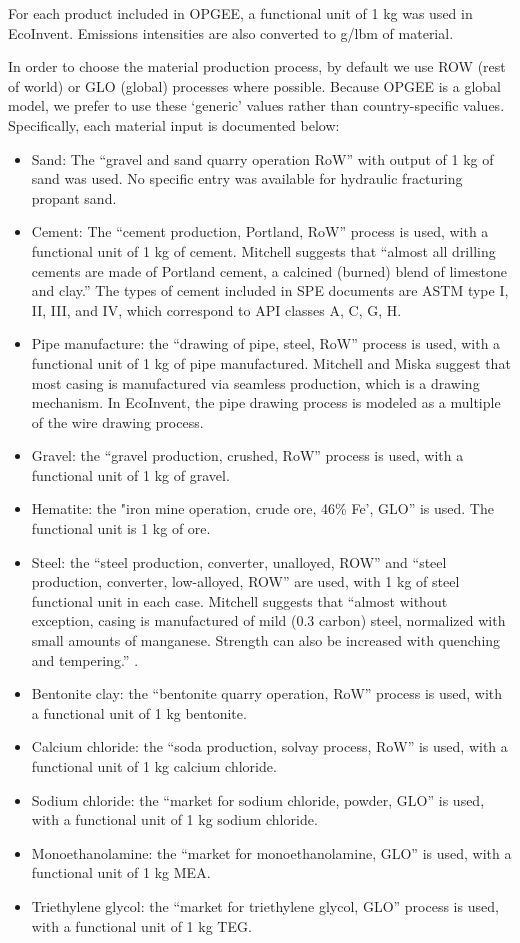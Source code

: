 \documentclass[11pt]{report}
\begin{document}
For each product included in OPGEE, a functional unit of 1 kg was used in EcoInvent. Emissions intensities are also converted to g/lbm of material.

In order to choose the material production process, by default we use ROW (rest of world) or GLO (global) processes where possible. Because OPGEE is a global model, we prefer to use these `generic' values rather than country-specific values. Specifically, each material input is documented below:
\begin{itemize}
\item Sand: The ``gravel and sand quarry operation RoW'' with output of 1 kg of sand was used. No specific entry was available for hydraulic fracturing propant sand.
\item Cement: The ``cement production, Portland, RoW'' process is used, with a functional unit of 1 kg of cement. Mitchell suggests \cite[p. 382]{Mitchell2006} that ``almost all drilling cements are made of Portland cement, a calcined (burned) blend of limestone and clay.'' The types of cement included in SPE documents are ASTM type I, II, III, and IV, which correspond to API classes A, C, G, H.
\item Pipe manufacture: the ``drawing of pipe, steel, RoW'' process is used, with a functional unit of 1 kg of pipe manufactured. Mitchell and Miska \cite[p. 387]{Mitchell2011} suggest that most casing is manufactured via seamless production, which is a drawing mechanism. In EcoInvent, the pipe drawing process is modeled as a multiple of the wire drawing process.
\item Gravel: the ``gravel production, crushed, RoW'' process is used, with a functional unit of 1 kg of gravel.
\item Hematite: the "iron mine operation, crude ore, 46\% Fe', GLO'' is used. The functional unit is 1 kg of ore.
\item Steel: the ``steel production, converter, unalloyed, ROW'' and ``steel production, converter, low-alloyed, ROW'' are used, with 1 kg of steel functional unit in each case. Mitchell suggests that ``almost without exception, casing is manufactured of mild (0.3 carbon) steel, normalized with small amounts of manganese. Strength can also be increased with quenching and tempering.'' \cite[p. 288]{Mitchell2006}.
\item Bentonite clay: the ``bentonite quarry operation, RoW'' process is used, with a functional unit of 1 kg bentonite.
\item Calcium chloride: the ``soda production, solvay process, RoW'' is used, with a functional unit of 1 kg calcium chloride.
\item Sodium chloride: the ``market for sodium chloride, powder, GLO'' is used, with a functional unit of 1 kg sodium chloride.
\item Monoethanolamine: the ``market for monoethanolamine, GLO'' is used, with a functional unit of 1 kg MEA.
\item Triethylene glycol: the ``market for triethylene glycol, GLO'' process is used, with a functional unit of 1 kg TEG.
\end{itemize}
\end{document}
